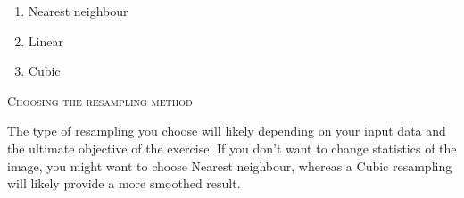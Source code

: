 \begin{enumerate}
\item Nearest neighbour
\item Linear
\item Cubic
\end{enumerate}

\begin{Tip}\caption{\textsc{Choosing the resampling method}}
The type of resampling you choose will likely depending on your input data and the ultimate objective of the exercise. If you don't want to change statistics of the image, you might want to choose Nearest neighbour, whereas a Cubic resampling will likely provide a more smoothed result.
\end{Tip}
